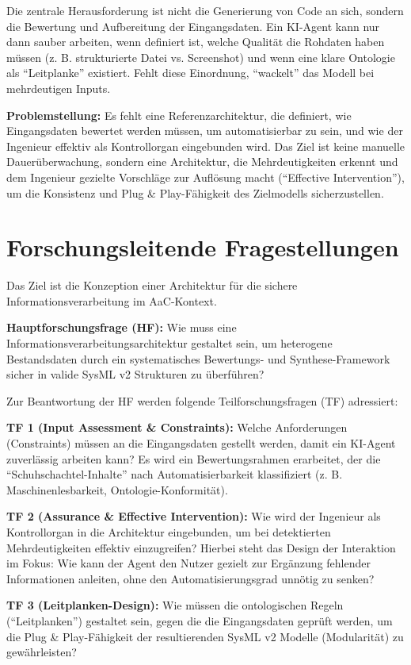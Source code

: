 \documentclass[12pt, a4paper]{article}
\begin{document}
Die zentrale Herausforderung ist nicht die Generierung von Code an sich, sondern die Bewertung und Aufbereitung der Eingangsdaten. Ein KI-Agent kann nur dann sauber arbeiten, wenn definiert ist, welche Qualität die Rohdaten haben müssen (z. B. strukturierte Datei vs. Screenshot) und wenn eine klare Ontologie als \enquote{Leitplanke} existiert. Fehlt diese Einordnung, \enquote{wackelt} das Modell bei mehrdeutigen Inputs.

\textbf{Problemstellung:}
Es fehlt eine Referenzarchitektur, die definiert, wie Eingangsdaten bewertet werden müssen, um automatisierbar zu sein, und wie der Ingenieur effektiv als Kontrollorgan eingebunden wird. Das Ziel ist keine manuelle Dauerüberwachung, sondern eine Architektur, die Mehrdeutigkeiten erkennt und dem Ingenieur gezielte Vorschläge zur Auflösung macht (\enquote{Effective Intervention}), um die Konsistenz und Plug \& Play-Fähigkeit des Zielmodells sicherzustellen.

\section{Forschungsleitende Fragestellungen}

Das Ziel ist die Konzeption einer Architektur für die sichere Informationsverarbeitung im AaC-Kontext.

\textbf{Hauptforschungsfrage (HF):}
Wie muss eine Informationsverarbeitungsarchitektur gestaltet sein, um heterogene Bestandsdaten durch ein systematisches Bewertungs- und Synthese-Framework sicher in valide SysML v2 Strukturen zu überführen?

Zur Beantwortung der HF werden folgende Teilforschungsfragen (TF) adressiert:

\textbf{TF 1 (Input Assessment \& Constraints):}
Welche Anforderungen (Constraints) müssen an die Eingangsdaten gestellt werden, damit ein KI-Agent zuverlässig arbeiten kann? Es wird ein Bewertungsrahmen erarbeitet, der die \enquote{Schuhschachtel-Inhalte} nach Automatisierbarkeit klassifiziert (z. B. Maschinenlesbarkeit, Ontologie-Konformität).

\textbf{TF 2 (Assurance \& Effective Intervention):}
Wie wird der Ingenieur als Kontrollorgan in die Architektur eingebunden, um bei detektierten Mehrdeutigkeiten effektiv einzugreifen? Hierbei steht das Design der Interaktion im Fokus: Wie kann der Agent den Nutzer gezielt zur Ergänzung fehlender Informationen anleiten, ohne den Automatisierungsgrad unnötig zu senken?

\textbf{TF 3 (Leitplanken-Design):}
Wie müssen die ontologischen Regeln (\enquote{Leitplanken}) gestaltet sein, gegen die die Eingangsdaten geprüft werden, um die Plug \& Play-Fähigkeit der resultierenden SysML v2 Modelle (Modularität) zu gewährleisten?
\newpage
\end{document}
